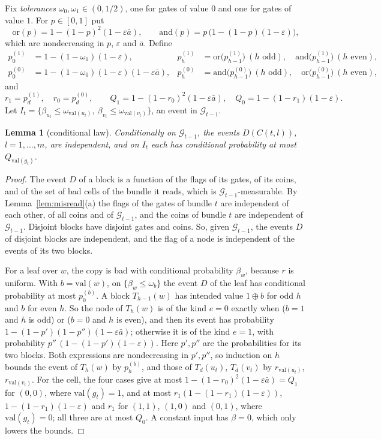 \documentclass[11pt]{amsart}
\newtheorem{lemma}[theorem]{Lemma}
\theoremstyle{definition}
\theoremstyle{remark}
\newcommand{\eps}{\varepsilon}
\newcommand{\val}{\mathrm{val}}
\begin{document}
Fix \emph{tolerances} $\omega_0,\omega_1\in(0,1/2)$, one for gates of value $0$ and one for gates
of value $1$. For $p\in[0,1]$ put
\[
\mathrm{or}(p)=1-(1-p)^2(1-\eps\bar a),\qquad\mathrm{and}(p)=p\,\bigl(1-(1-p)(1-\eps)\bigr),
\]
which are nondecreasing in $p$, $\eps$ and $\bar a$. Define
\begin{align*}
p^{(1)}_0&=1-(1-\omega_1)(1-\eps), & p^{(1)}_h&=\mathrm{or}\bigl(p^{(1)}_{h-1}\bigr)\ (h\text{ odd}),\quad \mathrm{and}\bigl(p^{(1)}_{h-1}\bigr)\ (h\text{ even}),\\
p^{(0)}_0&=1-(1-\omega_0)(1-\eps)(1-\eps\bar a), & p^{(0)}_h&=\mathrm{and}\bigl(p^{(0)}_{h-1}\bigr)\ (h\text{ odd}),\quad \mathrm{or}\bigl(p^{(0)}_{h-1}\bigr)\ (h\text{ even}),
\end{align*}
and
\[
r_1=p^{(1)}_d,\quad r_0=p^{(0)}_d,\qquad Q_1=1-(1-r_0)^2(1-\eps\bar a),\quad Q_0=1-(1-r_1)(1-\eps).
\]
Let $I_t=\{\beta_{u_t}\le\omega_{\val(u_t)},\ \beta_{v_t}\le\omega_{\val(v_t)}\}$, an event in
$\mathcal G_{t-1}$.

\begin{lemma}[conditional law]\label{lem:law}
Conditionally on $\mathcal G_{t-1}$, the events $D(C(t,l))$, $l=1,\dots,m$, are independent, and on
$I_t$ each has conditional probability at most $Q_{\val(g_t)}$.
\end{lemma}

\begin{proof}
The event $D$ of a block is a function of the flags of its gates, of its coins, and of the set of
bad cells of the bundle it reads, which is $\mathcal G_{t-1}$-measurable. By
Lemma~\ref{lem:misread}(a) the flags of the gates of bundle $t$ are independent of each other, of
all coins and of $\mathcal G_{t-1}$, and the coins of bundle $t$ are independent of
$\mathcal G_{t-1}$. Disjoint blocks have disjoint gates and coins. So, given $\mathcal G_{t-1}$, the
events $D$ of disjoint blocks are independent, and the flag of a node is independent of the events
of its two blocks.

For a leaf over $w$, the copy is bad with conditional probability $\beta_w$, because $r$ is
uniform. With $b=\val(w)$, on $\{\beta_w\le\omega_b\}$ the event $D$ of the leaf has conditional
probability at most $p^{(b)}_0$. A block $T_{h-1}(w)$ has intended value $1\oplus b$ for odd $h$
and $b$ for even $h$. So the node of $T_h(w)$ is of the kind $e=0$ exactly when ($b=1$ and $h$ is
odd) or ($b=0$ and $h$ is even), and then its event has probability
$1-(1-p')(1-p'')(1-\eps\bar a)$; otherwise it is of the kind $e=1$, with probability
$p''\,(1-(1-p')(1-\eps))$. Here $p',p''$ are the probabilities for its two blocks. Both expressions
are nondecreasing in $p',p''$, so induction on $h$ bounds the event of $T_h(w)$ by $p^{(b)}_h$, and
those of $T_d(u_t)$, $T_d(v_t)$ by $r_{\val(u_t)}$, $r_{\val(v_t)}$. For the cell, the four cases
give at most $1-(1-r_0)^2(1-\eps\bar a)=Q_1$ for $(0,0)$, where $\val(g_t)=1$, and at most
$r_1(1-(1-r_1)(1-\eps))$, $1-(1-r_1)(1-\eps)$ and $r_1$ for $(1,1)$, $(1,0)$ and $(0,1)$, where
$\val(g_t)=0$; all three are at most $Q_0$. A constant input has $\beta=0$, which only lowers the
bounds.
\end{proof}
\end{document}
